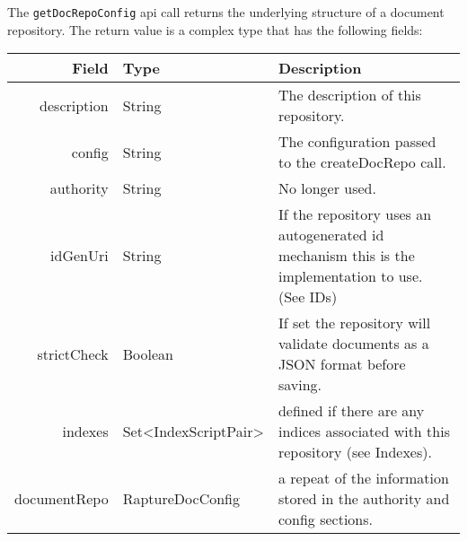 The \verb+getDocRepoConfig+ api call returns the underlying structure of a document repository. The return
value is a complex type that has the following fields:

\begin{table}[h]
\begin{center}
\begin{tabular}{r l p{8cm}}
  Field & Type & Description \\
  \hline
  description & String & The description of this repository. \\
  config & String & The configuration passed to the createDocRepo call. \\
  authority & String & No longer used. \\
  idGenUri & String & If the repository uses an autogenerated id mechanism this is the implementation to use. (See IDs) \\
  strictCheck & Boolean & If set the repository will validate documents as a JSON format before saving. \\
  indexes & Set<IndexScriptPair> & defined if there are any indices associated with this repository (see Indexes). \\
  documentRepo & RaptureDocConfig & a repeat of the information stored in the authority and config sections. \\
\end{tabular}
\end{center}
\end{table}
